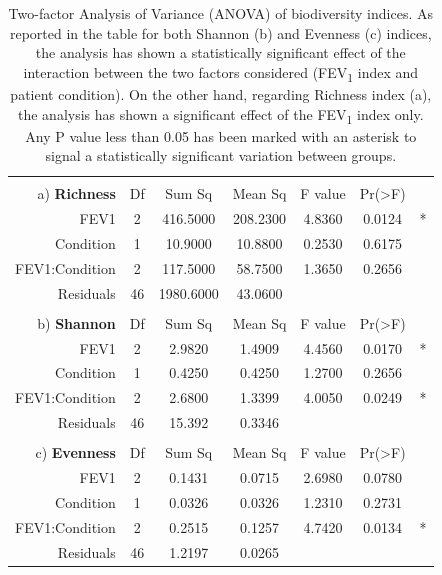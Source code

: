 \begin{table}
\centering
\scriptsize
\begin{tabular}{ r c c c c c l}
  &  &  &  &  &  &  \\
a) \hfill \textbf{Richness} & Df & Sum Sq & Mean Sq & F value & Pr(>F) & \\
\hline\hline
FEV1 & 2 & 416.5000 & 208.2300 & 4.8360 & 0.0124 & * \\
Condition & 1 & 10.9000 & 10.8800 & 0.2530 & 0.6175 & \\
FEV1:Condition & 2 & 117.5000 & 58.7500 & 1.3650 & 0.2656 & \\
Residuals & 46 & 1980.6000 & 43.0600 &  &  & \\
\hline
  &  &  &  &  &  & \\
b) \hfill \textbf{Shannon} & Df & Sum Sq & Mean Sq & F value & Pr(>F) & \\
\hline\hline
FEV1 & 2 & 2.9820 & 1.4909 & 4.4560 & 0.0170 &  * \\
Condition & 1 & 0.4250 & 0.4250 & 1.2700 & 0.2656 & \\
FEV1:Condition & 2 & 2.6800 & 1.3399 & 4.0050 & 0.0249 & * \\
Residuals & 46 & 15.392 & 0.3346 &  &  & \\
\hline
  &  &  &  &  &  & \\
c) \hfill \textbf{Evenness} & Df & Sum Sq & Mean Sq & F value & Pr(>F) & \\
\hline\hline
FEV1 & 2 & 0.1431 & 0.0715 & 2.6980 & 0.0780 & \\
Condition & 1 & 0.0326 & 0.0326 & 1.2310 & 0.2731 & \\
FEV1:Condition & 2 & 0.2515 & 0.1257 & 4.7420 & 0.0134 & * \\
Residuals & 46 & 1.2197 & 0.0265 &  &  & \\
\hline
\end{tabular}
\caption{\label{tab:ffc316s}Two-factor Analysis of Variance (ANOVA) of biodiversity indices. As reported in the table for both Shannon (b) and Evenness (c) indices, the analysis has shown a statistically significant effect of the interaction between the two factors considered (FEV\textsubscript{1} index and patient condition). On the other hand, regarding Richness index (a), the analysis has shown a significant effect of the FEV\textsubscript{1} index only. Any P value less than 0.05 has been marked with an asterisk to signal a statistically significant variation between groups.} 
\end{table}
